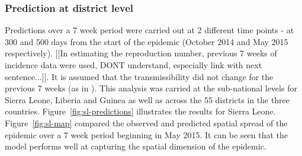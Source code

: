 \documentclass[11pt,]{article}
\begin{document}
\subsubsection{Prediction at district level}

Predictions over a 7 week period were carried out at 2 different time points - at 300 and
500 days from the start of the epidemic (October 2014 and May 2015
respectively). [[In estimating the reproduction number, previous 7 weeks
of incidence data were used, DONT understand, especially link with next sentence...]]. 
It is assumed that the 
transmissibility did not change for the previous 7 weeks (as in
\cite{team2015west}). This analysis was carried at the sub-national
levels for Sierra Leone, Liberia and
Guinea as well as across the 55 districts in the three countries.
Figure~\ref{fig:sl-predictions} illustrates the results for
Sierra Leone.  Figure~\ref{fig:sl-map} compared the observed and
predicted spatial spread of the epidemic over a 7 week period
beginning in May 2015. It can be seen that the model performs well at
capturing the spatial dimension of the epidemic.
\end{document}
